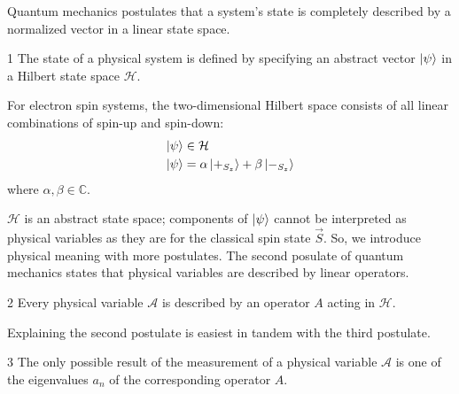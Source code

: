 Quantum mechanics postulates that a system's state is completely described by a normalized vector in a linear state space.
\begin{Thm:Postulate}{1}
    The state of a physical system is defined by specifying an abstract vector $\ket{\psi}$ in a Hilbert state space $\mathcal{H}$.
\end{Thm:Postulate}

For electron spin systems, the two-dimensional Hilbert space consists of all linear combinations of spin-up and spin-down:
\begin{align}
  \ket{\psi} &\in \mathcal{H} \\ \nonumber
  \ket{\psi} &= \alpha\ket{+_{S_z}} + \beta\ket{-_{S_z}}
\end{align}
where $\alpha, \beta \in \mathbb{C}$.

$\mathcal{H}$ is an abstract state space; components of $\ket{\psi}$ cannot be interpreted as physical variables as they are for the classical spin state $\vec{S}$. So, we introduce physical meaning with more postulates.
The second posulate of quantum mechanics states that physical variables are described by linear operators.
\begin{Thm:Postulate}{2}
    Every physical variable $\mathcal{A}$ is described by an operator $A$ acting in $\mathcal{H}$.
\end{Thm:Postulate}
Explaining the second postulate is easiest in tandem with the third postulate.
\begin{Thm:Postulate}{3}
    The only possible result of the measurement of a physical variable $\mathcal{A}$ is one of the eigenvalues $a_n$ of the corresponding operator $A$.
\end{Thm:Postulate}

